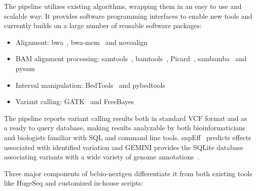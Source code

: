 \documentclass{frontiersSCNS}
\begin{document}
The pipeline utilizes existing algorithms, wrapping them in an easy to use and
scalable way. It provides software programming interfaces to enable new tools
and currently builds on a large number of reusable software packages:

\begin{itemize}
  \item Alignment: bwa~\citep{li_fast_2010}, bwa-mem~\citep{li_aligning_2013} and
    novoalign~\citep{novoalign}
  \item BAM alignment processing: samtools~\citep{li_sequence_2009},
    bamtools~\citep{bamtools}, Picard~\citep{picard},
    sambamba~\citep{sambamba} and pysam~\citep{pysam}
  \item Interval manipulation: BedTools~\citep{quinlan_bedtools:_2010} and
    pybedtools~\citep{dale_pybedtools:_2011}
  \item Variant calling: GATK~\citep{depristo_framework_2011} and
    FreeBayes~\citep{garrison_haplotype-based_2012}
\end{itemize}

The pipeline reports variant calling results both in standard VCF format and
as a ready to query database, making results analyzable by both
bioinformaticians and biologists familiar with SQL and command line tools.
snpEff~\citep{cingolani_program_2012} predicts effects associated with
identified variation and GEMINI provides the SQLite database associating
variants with a wide variety of genome annotations~\citep{paila_gemini:_2013}.

Three major components of bcbio-nextgen differentiate it from
both existing tools like HugeSeq \citep{lam_detecting_2012} and customized
in-house scripts:
\end{document}
